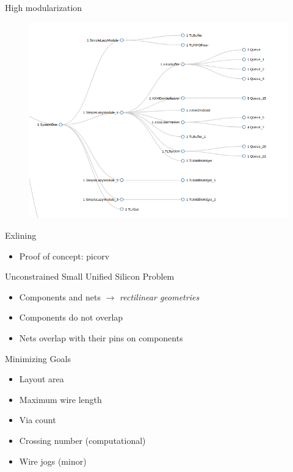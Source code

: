 \documentclass[9pt]{beamer}
\begin{document}
\begin{frame}{High modularization}
        \begin{figure}
        \centering
        \includegraphics[scale=0.32]{images/SystemBus.png}
        \end{figure}
\end{frame}

\begin{frame}{Exlining}
	\begin{itemize}
        \setlength\itemsep{1em}
		\item Proof of concept: picorv
	\end{itemize}
\end{frame}

\begin{frame}{Unconstrained Small Unified Silicon Problem}
	\begin{itemize}
        \setlength\itemsep{1em}
		\item Components and nets $\rightarrow$ \textit{rectilinear geometries}
		\item Components do not overlap
		\item Nets overlap with their pins on components
	\end{itemize}
\end{frame}

\begin{frame}{Minimizing Goals}
	\begin{itemize}
        \setlength\itemsep{1em}
		\item Layout area
		\item Maximum wire length 
		\item Via count
		\item Crossing number (computational)
		\item Wire jogs (minor)
	\end{itemize}
\end{frame}
\end{document}
